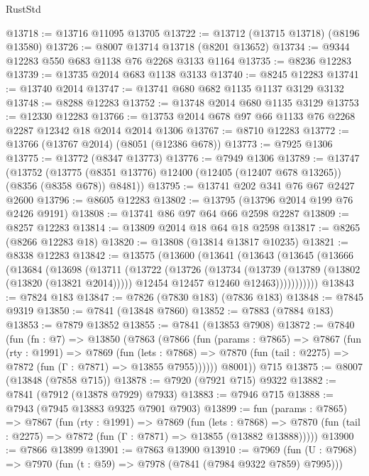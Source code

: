 \begin{lexlean}{RustStd}
\begin{coremodule}
@13718 := @13716 @11095 @13705
@13722 := @13712 (@13715 @13718) (@8196 @13580)
@13726 := @8007 @13714 @13718 (@8201 @13652)
@13734 := @9344 @12283 @550 @683 @1138 @76 @2268 @3133 @1164
@13735 := @8236 @12283
@13739 := @13735 @2014 @683 @1138 @3133
@13740 := @8245 @12283
@13741 := @13740 @2014
@13747 := @13741 @680 @682 @1135 @1137 @3129 @3132
@13748 := @8288 @12283
@13752 := @13748 @2014 @680 @1135 @3129
@13753 := @12330 @12283
@13766 := @13753 @2014 @678 @97 @66 @1133 @76 @2268 @2287 @12342 @18 @2014 @2014 @1306
@13767 := @8710 @12283
@13772 := @13766 (@13767 @2014) (@8051 (@12386 @678))
@13773 := @7925 @1306
@13775 := @13772 (@8347 @13773)
@13776 := @7949 @1306
@13789 := @13747
    (@13752 (@13775 (@8351 @13776) @12400 (@12405 (@12407 @678 @13265)) (@8356 (@8358 @678)) @8481))
@13795 := @13741 @202 @341 @76 @67 @2427 @2600
@13796 := @8605 @12283
@13802 := @13795 (@13796 @2014 @199 @76 @2426 @9191)
@13808 := @13741 @86 @97 @64 @66 @2598 @2287
@13809 := @8257 @12283
@13814 := @13809 @2014 @18 @64 @18 @2598
@13817 := @8265 (@8266 @12283 @18)
@13820 := @13808 (@13814 @13817 @10235)
@13821 := @8338 @12283
@13842 := @13575
    (@13600
      (@13641
        (@13643
          (@13645
            (@13666
              (@13684
                (@13698
                  (@13711
                    (@13722
                      (@13726
                        (@13734
                          (@13739 (@13789 (@13802 (@13820 (@13821 @2014)))))
                          @12454
                          @12457
                          @12460
                          @12463)))))))))))
@13843 := @7824 @183
@13847 := @7826 (@7830 @183) (@7836 @183)
@13848 := @7845 @9319
@13850 := @7841 (@13848 @7860)
@13852 := @7883 (@7884 @183)
@13853 := @7879 @13852
@13855 := @7841 (@13853 @7908)
@13872 := @7840
    (fun (fn : @7) =>
    @13850
      (@7863
        (@7866
          (fun (params : @7865) =>
          @7867
            (fun (rty : @1991) =>
            @7869
              (fun (lets : @7868) =>
              @7870 (fun (tail : @2275) => @7872 (fun (Γ : @7871) => @13855 @7955))))))
        @8001))
    @715
@13875 := @8007 (@13848 (@7858 @715))
@13878 := @7920 (@7921 @715) @9322
@13882 := @7841 (@7912 (@13878 @7929) @7933)
@13883 := @7946 @715
@13888 := @7943 (@7945 @13883 @9325 @7901 @7903)
@13899 := fun (params : @7865) =>
  @7867
    (fun (rty : @1991) =>
    @7869
      (fun (lets : @7868) =>
      @7870 (fun (tail : @2275) => @7872 (fun (Γ : @7871) => @13855 (@13882 @13888)))))
@13900 := @7866 @13899
@13901 := @7863 @13900
@13910 := @7969
    (fun (U : @7968) => @7970 (fun (t : @59) => @7978 (@7841 (@7984 @9322 @7859) @7995)))

\end{coremodule}
\end{lexlean}
